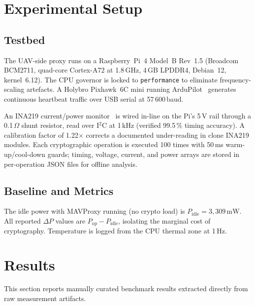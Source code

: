 \documentclass[conference]{IEEEtran}
\newcommand{\mW}{\,\si{\milli\watt}}
\begin{document}
\section{Experimental Setup}
\label{sec:eval}

\subsection{Testbed}

The UAV-side proxy runs on a Raspberry~Pi~4 Model~B Rev~1.5
(Broadcom BCM2711, quad-core Cortex-A72 at 1.8\,GHz, 4\,GB
LPDDR4, Debian~12, kernel~6.12).  The CPU governor is locked to
\texttt{performance} to eliminate frequency-scaling artefacts.  A
Holybro Pixhawk~6C mini running ArduPilot~\cite{ardupilot} generates
continuous heartbeat traffic over USB serial at 57\,600\,baud.

An INA219 current/power monitor~\cite{ina219} is wired in-line on
the Pi's 5\,V rail through a 0.1\,$\Omega$ shunt resistor, read
over I$^2$C at 1\,kHz (verified 99.5\,\% timing accuracy).  A
calibration factor of 1.22$\times$ corrects a documented
under-reading in clone INA219 modules.  Each cryptographic operation
is executed 100 times with 50\,ms warm-up/cool-down guards; timing,
voltage, current, and power arrays are stored in per-operation JSON
files for offline analysis.

\subsection{Baseline and Metrics}

The idle power with MAVProxy running (no crypto load) is
$P_\text{idle} = 3{,}309\mW$.  All reported $\Delta P$ values are
$P_\text{op} - P_\text{idle}$, isolating the marginal cost of
cryptography.  Temperature is logged from the CPU thermal zone at
1\,Hz.

\section{Results}
\label{sec:results}
This section reports manually curated benchmark results extracted directly from raw measurement artifacts.



\end{document}
